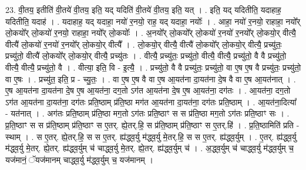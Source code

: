 \documentclass[17pt]{extarticle}
\begin{document}
23. वी॒तय॒ इतीति॑ वी॒तये॑ वी॒तय॒ इति॒ यद् यदिति॑ वी॒तये॑ वी॒तय॒ इति॒ यत् । . इति॒ यद् यदितीति॒ यदाहाह॒ यदितीति॒ यदाह॑ । . यदाहाह॒ यद् यदाहा॒ नयो॑ र॒नयो॒ राह॒ यद् यदाहा॒ नयोः᳚ । . आहा॒ नयो॑ र॒नयो॒ राहाहा॒ नयो᳚र् लो॒कयो᳚र् लो॒कयो॑ र॒नयो॒ राहाहा॒ नयो᳚र् लो॒कयोः᳚ । . अ॒नयो᳚र् लो॒कयो᳚र् लो॒कयो॑ र॒नयो॑ र॒नयो᳚र् लो॒कयो॒र् वीत्यै॒ वीत्यै॑ लो॒कयो॑ र॒नयो॑ र॒नयो᳚र् लो॒कयो॒र् वीत्यै᳚ । . लो॒कयो॒र् वीत्यै॒ वीत्यै॑ लो॒कयो᳚र् लो॒कयो॒र् वीत्यै॒ प्रच्यु॑तः॒ प्रच्यु॑तो॒ वीत्यै॑ लो॒कयो᳚र् लो॒कयो॒र् वीत्यै॒ प्रच्यु॑तः । . वीत्यै॒ प्रच्यु॑तः॒ प्रच्यु॑तो॒ वीत्यै॒ वीत्यै॒ प्रच्यु॑तो॒ वै वै प्रच्यु॑तो॒ वीत्यै॒ वीत्यै॒ प्रच्यु॑तो॒ वै । . वीत्या॒ इति॒ वि - इ॒त्यै॒ । . प्रच्यु॑तो॒ वै वै प्रच्यु॑तः॒ प्रच्यु॑तो॒ वा ए॒ष ए॒ष वै प्रच्यु॑तः॒ प्रच्यु॑तो॒ वा ए॒षः । . प्रच्यु॑त॒ इति॒ प्र - च्यु॒तः॒ । . वा ए॒ष ए॒ष वै वा ए॒ष आ॒यत॑ना दा॒यत॑ना दे॒ष वै वा ए॒ष आ॒यत॑नात् । . ए॒ष आ॒यत॑ना दा॒यत॑ना दे॒ष ए॒ष आ॒यत॑ना॒ दग॒तो ऽग॑त आ॒यत॑ना दे॒ष ए॒ष आ॒यत॑ना॒ दग॑तः । . आ॒यत॑ना॒ दग॒तो ऽग॑त आ॒यत॑ना दा॒यत॑ना॒ दग॑तः प्रति॒ष्ठाम् प्र॑ति॒ष्ठा मग॑त आ॒यत॑ना दा॒यत॑ना॒ दग॑तः प्रति॒ष्ठाम् । . आ॒यत॑ना॒दित्या᳚ - यत॑नात् । . अग॑तः प्रति॒ष्ठाम् प्र॑ति॒ष्ठा मग॒तो ऽग॑तः प्रति॒ष्ठाꣳ स स प्र॑ति॒ष्ठा मग॒तो ऽग॑तः प्रति॒ष्ठाꣳ सः । . प्र॒ति॒ष्ठाꣳ स स प्र॑ति॒ष्ठाम् प्र॑ति॒ष्ठाꣳ स ए॒तर्. ह्ये॒तर्.हि॒ स प्र॑ति॒ष्ठाम् प्र॑ति॒ष्ठाꣳ स ए॒तर्.हि॑ । . प्र॒ति॒ष्ठामिति॑ प्रति - स्थाम् । . स ए॒तर्. ह्ये॒तर्.हि॒ स स ए॒तर्. ह्य॑द्ध्व॒र्यु म॑द्ध्व॒र्यु मे॒तर्.हि॒ स स ए॒तर्. ह्य॑द्ध्व॒र्युम् । . ए॒तर्. ह्य॑द्ध्व॒र्यु म॑द्ध्व॒र्यु मे॒तर्. ह्ये॒तर्. ह्य॑द्ध्व॒र्युम् च॑ चाद्ध्व॒र्यु मे॒तर्. ह्ये॒तर्. ह्य॑द्ध्व॒र्युम् च॑ । . अ॒द्ध्व॒र्युम् च॑ चाद्ध्व॒र्यु म॑द्ध्व॒र्युम् च॒ यज॑मानं॒ ॅयज॑मानम् चाद्ध्व॒र्यु म॑द्ध्व॒र्युम् च॒ यज॑मानम् । \newline
\end{document}
